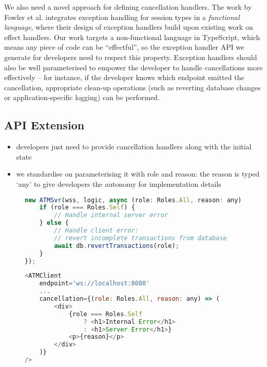 We also need a novel approach for defining cancellation handlers.
The work by Fowler et al. \cite{Exceptional} integrates 
exception handling for session types in a 
\textit{functional language}, where their design of
exception handlers build upon existing work on effect handlers.
Our work targets a non-functional language in TypeScript,
which means any piece of code can be ``effectful'',
so the exception handler API we generate for developers
need to respect this property.
Exception handlers should also be well parameterised
to empower the developer to handle cancellations more effectively
-- for instance, if the developer knows which endpoint
emitted the cancellation, appropriate clean-up operations
(such as reverting database changes or application-specific
logging) can be performed.

\subsection{API Extension}
\label{subsection:errorapi}

\begin{itemize}
\item developers just need to provide cancellation handlers along with the initial state
\item we standardise on parameterising it with role and reason: the reason is typed `any' to give developers the autonomy for implementation details
\end{itemize}

\begin{figure}[!h]
\begin{lstlisting}[language=javascript]
new ATMSvr(wss, logic, async (role: Roles.All, reason: any) => {
	if (role === Roles.Self) {
		// Handle internal server error	
	} else {
		// Handle client error:
		// revert incomplete transactions from database
		await db.revertTransactions(role);
	}
});
\end{lstlisting}
\label{lst:cancelsvr}
\end{figure}

\begin{figure}[!h]
\begin{lstlisting}[language=javascript]
<ATMClient
	endpoint='ws://localhost:8080'
	...
	cancellation={(role: Roles.All, reason: any) => (
		<div>
			{role === Roles.Self
				? <h1>Internal Error</h1>
				: <h1>Server Error</h1>}
			<p>{reason}</p>
		</div>
	)}	
/>
\end{lstlisting}
\label{lst:cancelclient}
\end{figure}

